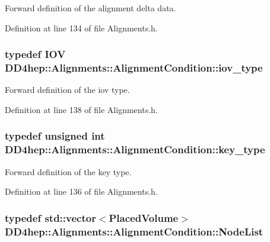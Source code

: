 Forward definition of the alignment delta data. 

Definition at line 134 of file Alignments.h.\hypertarget{class_d_d4hep_1_1_alignments_1_1_alignment_condition_a95e1d25777aca1542555e477c8233968}{
\subsubsection[{iov\_\-type}]{\setlength{\rightskip}{0pt plus 5cm}typedef {\bf IOV} {\bf DD4hep::Alignments::AlignmentCondition::iov\_\-type}}}
\label{class_d_d4hep_1_1_alignments_1_1_alignment_condition_a95e1d25777aca1542555e477c8233968}


Forward definition of the iov type. 

Definition at line 138 of file Alignments.h.\hypertarget{class_d_d4hep_1_1_alignments_1_1_alignment_condition_a6ae3e6421b162cdd440b60d5a4e1ed92}{
\subsubsection[{key\_\-type}]{\setlength{\rightskip}{0pt plus 5cm}typedef unsigned int {\bf DD4hep::Alignments::AlignmentCondition::key\_\-type}}}
\label{class_d_d4hep_1_1_alignments_1_1_alignment_condition_a6ae3e6421b162cdd440b60d5a4e1ed92}


Forward definition of the key type. 

Definition at line 136 of file Alignments.h.\hypertarget{class_d_d4hep_1_1_alignments_1_1_alignment_condition_ae1ff696352ce5e8726973ea89cf80d8a}{
\subsubsection[{NodeList}]{\setlength{\rightskip}{0pt plus 5cm}typedef std::vector$<${\bf PlacedVolume}$>$ {\bf DD4hep::Alignments::AlignmentCondition::NodeList}}}
\label{class_d_d4hep_1_1_alignments_1_1_alignment_condition_ae1ff696352ce5e8726973ea89cf80d8a}


